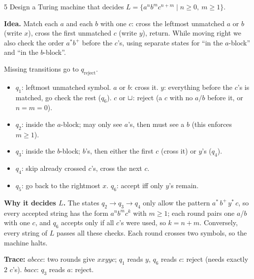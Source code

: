 \begin{question}{5}
Design a Turing machine that decides $L=\{a^nb^mc^{n+m}\mid n\ge 0,\ m\ge 1\}$.
\end{question}
\begin{soln}
\textbf{Idea.} Match each $a$ and each $b$ with one $c$: cross the leftmost unmatched $a$ or $b$ (write $x$), cross the first unmatched $c$ (write $y$), return. While moving right we also check the order $a^*b^+$ before the $c$'s, using separate states for ``in the $a$-block'' and ``in the $b$-block''.

\begin{center}

{\footnotesize Missing transitions go to $q_{\mathrm{reject}}$.}
\end{center}

\begin{itemize}
\item $q_1$: leftmost unmatched symbol. $a$ or $b$: cross it. $y$: everything before the $c$'s is matched, go check the rest ($q_6$). $c$ or $\sqcup$: reject (a $c$ with no $a/b$ before it, or $n=m=0$).
\item $q_2$: inside the $a$-block; may only see $a$'s, then must see a $b$ (this enforces $m\ge1$).
\item $q_3$: inside the $b$-block; $b$'s, then either the first $c$ (cross it) or $y$'s ($q_4$).
\item $q_4$: skip already crossed $c$'s, cross the next $c$.
\item $q_5$: go back to the rightmost $x$. \quad $q_6$: accept iff only $y$'s remain.
\end{itemize}

\textbf{Why it decides $L$.} The states $q_2\to q_3\to q_4$ only allow the pattern $a^*\,b^+\,y^*\,c$, so every accepted string has the form $a^nb^mc^k$ with $m\ge1$; each round pairs one $a$/$b$ with one $c$, and $q_6$ accepts only if all $c$'s were used, so $k=n+m$. Conversely, every string of $L$ passes all these checks. Each round crosses two symbols, so the machine halts.

\textbf{Trace:} $abccc$: two rounds give $xxyyc$; $q_1$ reads $y$, $q_6$ reads $c$: reject (needs exactly $2$ $c$'s). $bacc$: $q_3$ reads $a$: reject.
\end{soln}

